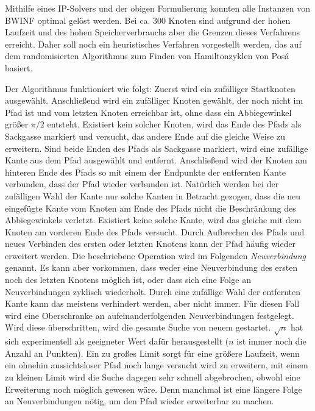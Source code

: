\documentclass[a4paper, 10pt, ngerman]{article}
\begin{document}
Mithilfe eines IP-Solvers und der obigen Formulierung konnten alle Instanzen von BWINF optimal gelöst werden. Bei ca. 300 Knoten sind aufgrund der hohen Laufzeit und des hohen Speicherverbrauchs aber die Grenzen dieses Verfahrens erreicht. Daher soll noch ein heuristisches Verfahren vorgestellt werden, das auf dem randomisierten Algorithmus zum Finden von Hamiltonzyklen von Posá \cite{discrete-math} basiert.

Der Algorithmus funktioniert wie folgt: Zuerst wird ein zufälliger Startknoten ausgewählt. Anschließend wird ein zufälliger Knoten gewählt, der noch nicht im Pfad ist und vom letzten Knoten erreichbar ist, ohne dass ein Abbiegewinkel größer $\pi / 2$ entsteht. Existiert kein solcher Knoten, wird das Ende des Pfads als Sackgasse markiert und versucht, das andere Ende auf die gleiche Weise zu erweitern. Sind beide Enden des Pfads als Sackgasse markiert, wird eine zufällige Kante aus dem Pfad ausgewählt und entfernt. Anschließend wird der Knoten am hinteren Ende des Pfads so mit einem der Endpunkte der entfernten Kante verbunden, dass der Pfad wieder verbunden ist. Natürlich werden bei der zufälligen Wahl der Kante nur solche Kanten in Betracht gezogen, dass die neu eingefügte Kante vom Knoten am Ende des Pfads nicht die Beschränkung des Abbiegewinkels verletzt. Existiert keine solche Kante, wird das gleiche mit dem Knoten am vorderen Ende des Pfads versucht. Durch Aufbrechen des Pfads und neues Verbinden des ersten oder letzten Knotens kann der Pfad häufig wieder erweitert werden. Die beschriebene Operation wird im Folgenden \emph{Neuverbindung} genannt. Es kann aber vorkommen, dass weder eine Neuverbindung des ersten noch des letzten Knotens möglich ist, oder dass sich eine Folge an Neuverbindungen zyklisch wiederholt. Durch eine zufällige Wahl der entfernten Kante kann das meistens verhindert werden, aber nicht immer. Für diesen Fall wird eine Oberschranke an aufeinanderfolgenden Neuverbindungen festgelegt. Wird diese überschritten, wird die gesamte Suche von neuem gestartet. $\sqrt n$ hat sich experimentell als geeigneter Wert dafür herausgestellt ($n$ ist immer noch die Anzahl an Punkten). Ein zu großes Limit sorgt für eine größere Laufzeit, wenn ein ohnehin aussichtsloser Pfad noch lange versucht wird zu erweitern, mit einem zu kleinen Limit wird die Suche dagegen sehr schnell abgebrochen, obwohl eine Erweiterung noch möglich gewesen wäre. Denn manchmal ist eine längere Folge an Neuverbindungen nötig, um den Pfad wieder erweiterbar zu machen.
\end{document}
